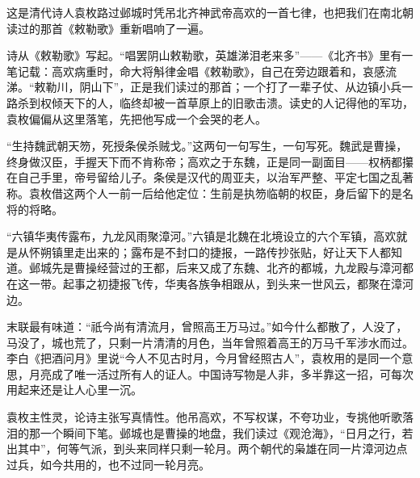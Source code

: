 \begin{appreciation}
这是清代诗人袁枚路过邺城时凭吊北齐神武帝高欢的一首七律，也把我们在南北朝读过的那首《敕勒歌》重新唱响了一遍。

诗从《敕勒歌》写起。“唱罢阴山敕勒歌，英雄涕泪老来多”——《北齐书》里有一笔记载：高欢病重时，命大将斛律金唱《敕勒歌》，自己在旁边跟着和，哀感流涕。“敕勒川，阴山下”，正是我们读过的那首；一个打了一辈子仗、从边镇小兵一路杀到权倾天下的人，临终却被一首草原上的旧歌击溃。读史的人记得他的军功，袁枚偏偏从这里落笔，先把他写成一个会哭的老人。

“生持魏武朝天笏，死授条侯杀贼戈。”这两句一句写生，一句写死。魏武是曹操，终身做汉臣，手握天下而不肯称帝；高欢之于东魏，正是同一副面目——权柄都攥在自己手里，帝号留给儿子。条侯是汉代的周亚夫，以治军严整、平定七国之乱著称。袁枚借这两个人一前一后给他定位：生前是执笏临朝的权臣，身后留下的是名将的将略。

“六镇华夷传露布，九龙风雨聚漳河。”六镇是北魏在北境设立的六个军镇，高欢就是从怀朔镇里走出来的；露布是不封口的捷报，一路传抄张贴，好让天下人都知道。邺城先是曹操经营过的王都，后来又成了东魏、北齐的都城，九龙殿与漳河都在这一带。起事之初捷报飞传，华夷各族争相跟从，到头来一世风云，都聚在漳河边。

末联最有味道：“祇今尚有清流月，曾照高王万马过。”如今什么都散了，人没了，马没了，城也荒了，只剩一片清清的月色，当年曾照着高王的万马千军涉水而过。李白《把酒问月》里说“今人不见古时月，今月曾经照古人”，袁枚用的是同一个意思，月亮成了唯一活过所有人的证人。中国诗写物是人非，多半靠这一招，可每次用起来还是让人心里一沉。

袁枚主性灵，论诗主张写真情性。他吊高欢，不写权谋，不夸功业，专挑他听歌落泪的那一个瞬间下笔。邺城也是曹操的地盘，我们读过《观沧海》，“日月之行，若出其中”，何等气派，到头来同样只剩一轮月。两个朝代的枭雄在同一片漳河边点过兵，如今共用的，也不过同一轮月亮。
\end{appreciation}
